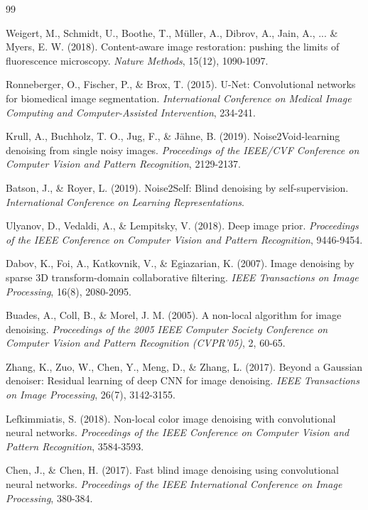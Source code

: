 \documentclass[12pt,a4paper]{report}
\begin{document}
\begin{thebibliography}{99}

Weigert, M., Schmidt, U., Boothe, T., Müller, A., Dibrov, A., Jain, A., ... \& Myers, E. W. (2018). Content-aware image restoration: pushing the limits of fluorescence microscopy. \textit{Nature Methods}, 15(12), 1090-1097.

Ronneberger, O., Fischer, P., \& Brox, T. (2015). U-Net: Convolutional networks for biomedical image segmentation. \textit{International Conference on Medical Image Computing and Computer-Assisted Intervention}, 234-241.

Krull, A., Buchholz, T. O., Jug, F., \& Jähne, B. (2019). Noise2Void-learning denoising from single noisy images. \textit{Proceedings of the IEEE/CVF Conference on Computer Vision and Pattern Recognition}, 2129-2137.

Batson, J., \& Royer, L. (2019). Noise2Self: Blind denoising by self-supervision. \textit{International Conference on Learning Representations}.

Ulyanov, D., Vedaldi, A., \& Lempitsky, V. (2018). Deep image prior. \textit{Proceedings of the IEEE Conference on Computer Vision and Pattern Recognition}, 9446-9454.

Dabov, K., Foi, A., Katkovnik, V., \& Egiazarian, K. (2007). Image denoising by sparse 3D transform-domain collaborative filtering. \textit{IEEE Transactions on Image Processing}, 16(8), 2080-2095.

Buades, A., Coll, B., \& Morel, J. M. (2005). A non-local algorithm for image denoising. \textit{Proceedings of the 2005 IEEE Computer Society Conference on Computer Vision and Pattern Recognition (CVPR'05)}, 2, 60-65.

Zhang, K., Zuo, W., Chen, Y., Meng, D., \& Zhang, L. (2017). Beyond a Gaussian denoiser: Residual learning of deep CNN for image denoising. \textit{IEEE Transactions on Image Processing}, 26(7), 3142-3155.

Lefkimmiatis, S. (2018). Non-local color image denoising with convolutional neural networks. \textit{Proceedings of the IEEE Conference on Computer Vision and Pattern Recognition}, 3584-3593.

Chen, J., \& Chen, H. (2017). Fast blind image denoising using convolutional neural networks. \textit{Proceedings of the IEEE International Conference on Image Processing}, 380-384.


\end{thebibliography}
\end{document}
